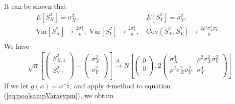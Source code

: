 \documentclass[12pt, a4paper]{article}
\newcommand{\cov}{\text{Cov}}
\newcommand{\var}{\text{Var}}
\begin{document}
	It can be shown that 
	\begin{equation}\label{eq:sampVarasypm}
	\begin{aligned}
	E[S_{X}^2] = \sigma_X^2,&~E[S_{Y}^2] = \sigma_Y^2,  \\
	\var[S_{X}^2] \rightarrow \frac{2\sigma_X^4}{n},~\var[S_{Y}^2] \rightarrow 
	\frac{2\sigma_Y^4}{n},&
	~\cov(S_{X}^2, S_{Y}^2) \rightarrow \frac{2\rho^2\sigma_X^2\sigma_Y^2}{n} \\
	\end{aligned}
	\end{equation} 
	We have 
	\begin{equation}\label{eq:poolsampVarasypm}
	\begin{aligned}
	& \sqrt{n}\left[\left( \begin{array}{c}
	S_{X, 1}^2\\
	S_{Y, 1}^2\\
	\end{array}\right)
	-
	\left( \begin{array}{c}
	\sigma_X^2\\
	\sigma_Y^2\\
	\end{array}\right)
	\right]
	\stackrel{d.}{\longrightarrow} 
	N\left[
	\left(\begin{array}{c}
	0\\
	0\\
	\end{array} \right), 
	2\left(
	\begin{array}{cc}
	\sigma_X^4 &\rho^2\sigma_X^2\sigma_Y^2 \\
	\rho^2\sigma_X^2\sigma_Y^2  &\sigma_Y^4 \\
	\end{array}
	\right)
	\right] 
	\end{aligned}
	\end{equation}
	If we let $g(x) = x^{-\frac{1}{2}}$, and apply $\delta$-method to equation 
	(\ref{eq:poolsampVarasypm}), we obtain
\end{document}
